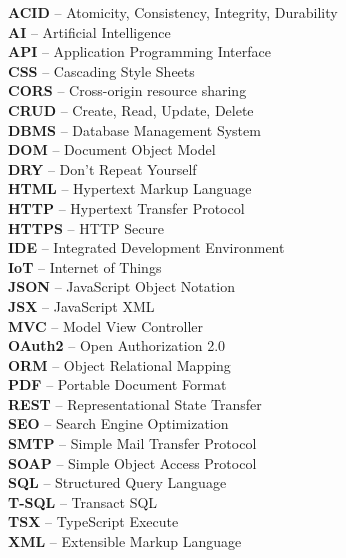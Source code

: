 \documentclass[twoside]{ctuthesis}
\begin{document}
\textbf{ACID} -- Atomicity, Consistency, Integrity, Durability \\
\textbf{AI} -- Artificial Intelligence \\
\textbf{API} -- Application Programming Interface \\
\textbf{CSS} -- Cascading Style Sheets \\
\textbf{CORS} -- Cross-origin resource sharing \\
\textbf{CRUD} -- Create, Read, Update, Delete \\
\textbf{DBMS} -- Database Management System \\
\textbf{DOM} -- Document Object Model \\
\textbf{DRY} -- Don't Repeat Yourself \\
\textbf{HTML} -- Hypertext Markup Language \\
\textbf{HTTP} -- Hypertext Transfer Protocol \\
\textbf{HTTPS} -- HTTP Secure \\
\textbf{IDE} -- Integrated Development Environment \\
\textbf{IoT} -- Internet of Things \\
\textbf{JSON} -- JavaScript Object Notation \\
\textbf{JSX} -- JavaScript XML \\
\textbf{MVC} -- Model View Controller \\
\textbf{OAuth2} -- Open Authorization 2.0 \\
\textbf{ORM} -- Object Relational Mapping \\
\textbf{PDF} -- Portable Document Format \\
\textbf{REST} -- Representational State Transfer \\
\textbf{SEO} -- Search Engine Optimization \\
\textbf{SMTP} -- Simple Mail Transfer Protocol \\
\textbf{SOAP} -- Simple Object Access Protocol \\
\textbf{SQL} -- Structured Query Language \\
\textbf{T-SQL} -- Transact SQL \\
\textbf{TSX} -- TypeScript Execute \\
\textbf{XML} -- Extensible Markup Language \\

\appendix
\end{document}
